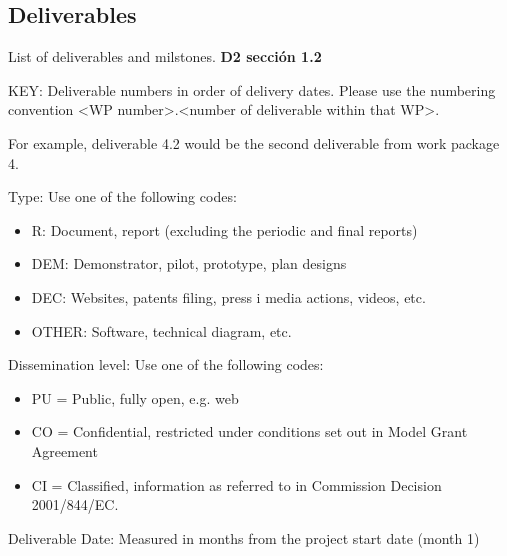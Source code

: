 \subsection{Deliverables}

List of deliverables and milstones. \textbf{D2 sección 1.2}

KEY: Deliverable numbers in order of delivery dates. Please use the numbering convention <WP number>.<number of deliverable within that WP>.

For example, deliverable 4.2 would be the second deliverable from work package 4.

Type: Use one of the following codes:
\begin{itemize}
\item R: Document, report (excluding the periodic and final reports) 
\item DEM: Demonstrator, pilot, prototype, plan designs
\item DEC: Websites, patents filing, press i media actions, videos, etc. 
\item OTHER: Software, technical diagram, etc.
\end{itemize}

Dissemination level: Use one of the following codes:
\begin{itemize}
\item PU = Public, fully open, e.g. web
\item CO = Confidential, restricted under conditions set out in Model Grant Agreement
\item CI = Classified, information as referred to in Commission Decision 2001/844/EC.
\end{itemize}

Deliverable Date: Measured in months from the project start date (month 1)


